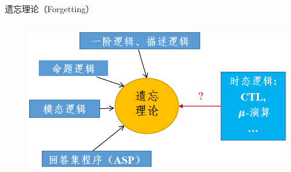 \documentclass[aspectratio=1610, 9pt, CJK]{beamer}
\begin{document}
\begin{frame}
{\begin{block}{遗忘理论（Forgetting）}
\begin{columns}
				\begin{figure}
					\includegraphics[scale=0.4]{figures/forgetting}
				\end{figure}
			\end{columns}
		\end{block}}
\end{frame}
\end{document}

